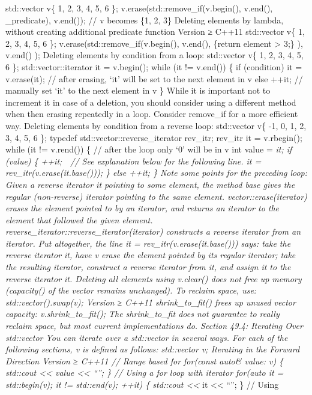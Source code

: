 std::vector v\{ 1, 2, 3, 4, 5, 6 \}; v.erase(std::remove\_if(v.begin(),
v.end(), \_predicate), v.end()); // v becomes \{1, 2, 3\} Deleting
elements by lambda, without creating additional predicate function
Version ≥ C++11 std::vector v\{ 1, 2, 3, 4, 5, 6 \};
v.erase(std::remove\_if(v.begin(), v.end(),
\href{auto\&\%20element}{}\{return element \textgreater{} 3;\} ),
v.end() ); Deleting elements by condition from a loop: std::vector v\{
1, 2, 3, 4, 5, 6 \}; std::vector::iterator it = v.begin(); while (it !=
v.end()) \{ if (condition) it = v.erase(it); // after erasing, `it' will
be set to the next element in v else ++it; // manually set `it' to the
next element in v \} While it is important not to increment it in case
of a deletion, you should consider using a diﬀerent method when then
erasing repeatedly in a loop. Consider remove\_if for a more eﬃcient
way. Deleting elements by condition from a reverse loop: std::vector v\{
-1, 0, 1, 2, 3, 4, 5, 6 \}; typedef std::vector::reverse\_iterator
rev\_itr; rev\_itr it = v.rbegin(); while (it != v.rend()) \{ // after
the loop only `0' will be in v int value = \emph{it; if (value) \{ ++it;
 // See explanation below for the following line. it =
rev\_itr(v.erase(it.base())); \} else ++it; \} Note some points for the
preceding loop: Given a reverse iterator it pointing to some element,
the method base gives the regular (non-reverse) iterator pointing to the
same element. vector::erase(iterator) erases the element pointed to by
an iterator, and returns an iterator to the element that followed the
given element. reverse\_iterator::reverse\_iterator(iterator) constructs
a reverse iterator from an iterator. Put altogether, the line it =
rev\_itr(v.erase(it.base())) says: take the reverse iterator it, have v
erase the element pointed by its regular iterator; take the resulting
iterator, construct a reverse iterator from it, and assign it to the
reverse iterator it. Deleting all elements using v.clear() does not free
up memory (capacity() of the vector remains unchanged). To reclaim
space, use: std::vector().swap(v); Version ≥ C++11 shrink\_to\_fit()
frees up unused vector capacity: v.shrink\_to\_fit(); The
shrink\_to\_fit does not guarantee to really reclaim space, but most
current implementations do. Section 49.4: Iterating Over std::vector You
can iterate over a std::vector in several ways. For each of the
following sections, v is deﬁned as follows: std::vector v; Iterating in
the Forward Direction Version ≥ C++11 // Range based for for(const
auto\& value: v) \{ std::cout \textless\textless{} value
\textless\textless{} ``\n''; \} // Using a for loop with iterator
for(auto it = std::begin(v); it != std::end(v); ++it) \{ std::cout
\textless\textless{} }it \textless\textless{} ``\n''; \} // Using
